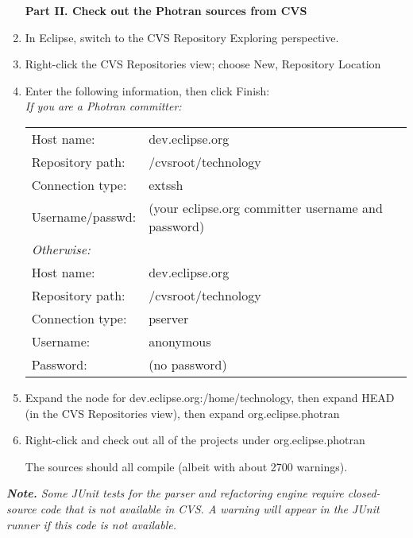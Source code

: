 \begin{enumerate}
\vspace{.5em}
\noindent\textbf{Part II.  Check out the Photran sources from CVS}

\item In Eclipse, switch to the CVS Repository Exploring perspective.
\item Right-click the CVS Repositories view; choose New, Repository Location
\item Enter the following information, then click Finish: \\
\textit{If you are a Photran committer:} \\
\begin{tabular}{ll}
        Host name:       & dev.eclipse.org \\
        Repository path: & /cvsroot/technology \\
        Connection type: & extssh \\
        Username/passwd: & (your eclipse.org committer username and password) \\
\textit{Otherwise:} \\
        Host name:       & dev.eclipse.org \\
        Repository path: & /cvsroot/technology \\
        Connection type: & pserver \\
        Username:        & anonymous \\
        Password:        & (no password) \\
\end{tabular}
\item Expand the node for dev.eclipse.org:/home/technology,
    then expand HEAD (in the CVS Repositories view), then expand
    org.eclipse.photran
\item Right-click and check out all of the projects under org.eclipse.photran

The sources should all compile (albeit with about 2700 warnings).

\end{enumerate}

\noindent\textit{\textbf{Note.} Some JUnit tests for the parser and refactoring
engine require closed-source code that is not available in CVS.  A warning will
appear in the JUnit runner if this code is not available.}
